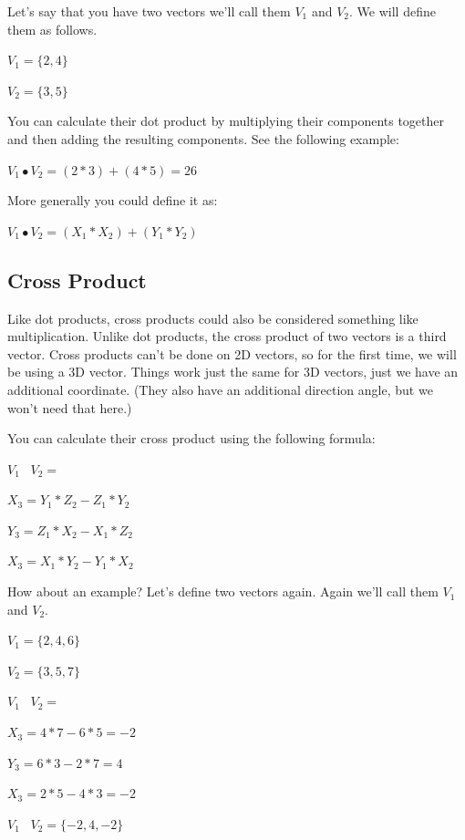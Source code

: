 \documentclass[]{book}
\begin{document}
Let's say that you have two vectors we'll call them $V_{1}$ and $V_{2}$.
We will define them as follows.

\bigskip
$V_{1} = \{2,4\}$

$V_{2} = \{3,5\}$

\bigskip
You can calculate their dot product by multiplying their components
together and then adding the resulting components. See the following
example:

\bigskip
$V_{1} \bullet V_{2} = (2*3)+(4*5) = 26$

\bigskip

More generally you could define it as:

\bigskip
$V_{1} \bullet V_{2} = (X_{1}*X_{2})+(Y_{1}*Y_{2})$

\subsection{Cross Product}

Like dot products, cross products could also be considered something like
multiplication.  Unlike dot products, the cross product of two vectors
is a third vector.  Cross products can't be done on 2D vectors, so for the
first time, we will be using a 3D vector.  Things work just the same for
3D vectors, just we have an additional coordinate. (They also have an
additional direction angle, but we won't need that here.)

You can calculate their cross product using the following formula:

\bigskip
$V_{1}$ \texttimes\ $V_{2} = $

$X_{3} = Y_{1}*Z_{2} - Z_{1}*Y_{2}$

$Y_{3} = Z_{1}*X_{2} - X_{1}*Z_{2}$

$X_{3} = X_{1}*Y_{2} - Y_{1}*X_{2}$
\bigskip

How about an example? Let's define two vectors again. Again we'll call them 
$V_{1}$ and $V_{2}$.

\bigskip
$V_{1} = \{2,4,6\}$

$V_{2} = \{3,5,7\}$

\bigskip

$V_{1}$ \texttimes\ $V_{2} = $

$X_{3} = 4*7 - 6*5 = -2$

$Y_{3} = 6*3 - 2*7 = 4$

$X_{3} = 2*5 - 4*3 = -2$

\bigskip

$V_{1}$ \texttimes\ $V_{2} = \{-2,4,-2\}$
\bigskip
\end{document}
